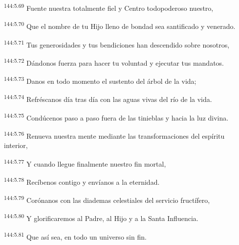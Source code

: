 \begin{center}
\par
\textsuperscript{144:5.69} Fuente nuestra totalmente fiel y Centro todopoderoso nuestro,

\par
\textsuperscript{144:5.70} Que el nombre de tu Hijo lleno de bondad sea santificado y venerado.

\par
\textsuperscript{144:5.71} Tus generosidades y tus bendiciones han descendido sobre nosotros,

\par
\textsuperscript{144:5.72} Dándonos fuerza para hacer tu voluntad y ejecutar tus mandatos.

\par
\textsuperscript{144:5.73} Danos en todo momento el sustento del árbol de la vida;

\par
\textsuperscript{144:5.74} Refréscanos día tras día con las aguas vivas del río de la vida.

\par
\textsuperscript{144:5.75} Condúcenos paso a paso fuera de las tinieblas y hacia la luz divina.

\par
\textsuperscript{144:5.76} Renueva nuestra mente mediante las transformaciones del espíritu interior,

\par
\textsuperscript{144:5.77} Y cuando llegue finalmente nuestro fin mortal,

\par
\textsuperscript{144:5.78} Recíbenos contigo y envíanos a la eternidad.

\par
\textsuperscript{144:5.79} Corónanos con las diademas celestiales del servicio fructífero,

\par
\textsuperscript{144:5.80} Y glorificaremos al Padre, al Hijo y a la Santa Influencia.

\par
\textsuperscript{144:5.81} Que así sea, en todo un universo sin fin.
\end{center}

